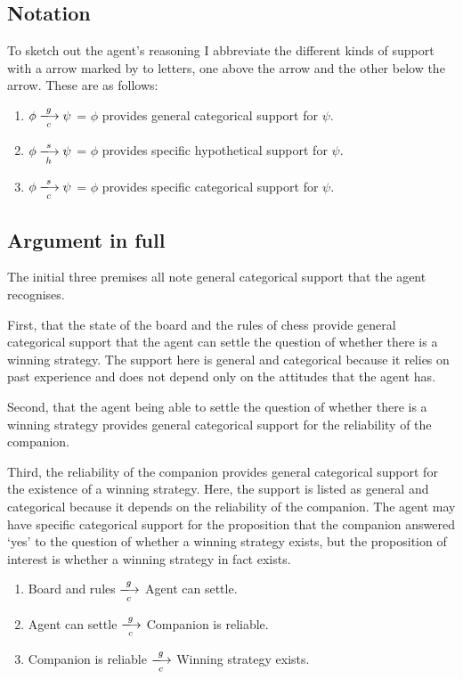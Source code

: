 \documentclass[10pt]{article}
\begin{document}
\subsection{Notation}
\label{sec:notation}

To sketch out the agent's reasoning I abbreviate the different kinds of support with a arrow marked by to letters, one above the arrow and the other below the arrow.
These are as follows:

\begin{enumerate}
\item \(\phi \xlongrightarrow[c]{g} \psi\) = \(\phi\) provides general categorical support for \(\psi\).
\item \(\phi \xlongrightarrow[h]{s} \psi\) = \(\phi\) provides specific hypothetical support for \(\psi\).
\item \(\phi \xlongrightarrow[c]{s} \psi\) = \(\phi\) provides specific categorical support for \(\psi\).
\end{enumerate}

\subsection{Argument in full}
\label{sec:argument-full}

The initial three premises all note general categorical support that the agent recognises.

First, that the state of the board and the rules of chess provide general categorical support that the agent can settle the question of whether there is a winning strategy.
The support here is general and categorical because it relies on past experience and does not depend only on the attitudes that the agent has.

Second, that the agent being able to settle the question of whether there is a winning strategy provides general categorical support for the reliability of the companion.

Third, the reliability of the companion provides general categorical support for the existence of a winning strategy.
Here, the support is listed as general and categorical because it depends on the reliability of the companion.
The agent may have specific categorical support for the proposition that the companion answered `yes' to the question of whether a winning strategy exists, but the proposition of interest is whether a winning strategy in fact exists.

\begin{enumerate}
\item\label{arg:bAr-settle} Board and rules \(\xlongrightarrow[c]{g}\) Agent can settle.
\item\label{arg:settle-reliable} Agent can settle \(\xlongrightarrow[c]{g}\) Companion is reliable.
\item\label{arg:reliable-ws} Companion is reliable \(\xlongrightarrow[c]{g}\) Winning strategy exists.
\end{enumerate}
\end{document}
